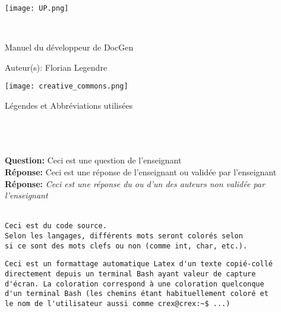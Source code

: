 \documentclass[a4paper, french]{report}
\begin{document}
\begin{titlepage}
    \begin{flushleft}
        \texttt{[image: UP.png]}\par
        \centering
        
        \vspace{13\baselineskip}       
        \HRule \\[0.4cm]

        {\Huge 
        Manuel du développeur de DocGen\par}
        \vspace{0.4cm}
        \HRule
        \vfill
      
        Auteur(s): Florian Legendre\medskip \par
        
        \texttt{[image: creative\_commons.png]}\par
    \end{flushleft}
\end{titlepage}

\newpage
\begin{LARGE}
Légendes et Abbréviations utilisées\\\\\\\\
\end{LARGE}
\textbf{Question:} Ceci est une question de l'enseignant\\
\textbf{Réponse:} Ceci est une réponse de l'enseignant ou validée par l'enseignant\\
\textbf{Réponse:} \textit{Ceci est une réponse du ou d'un des auteurs non validée par l'enseignant}\\\\

\begin{lstlisting}[style=C, caption=Exemple de code source]
Ceci est du code source.
Selon les langages, différents mots seront colorés selon 
si ce sont des mots clefs ou non (comme int, char, etc.).
\end{lstlisting}

\begin{mdframed}[style=Bash]
\begin{lstlisting}[style=Bash, caption=Exemple d'une pseudo capture d'écran Bash]
Ceci est un formattage automatique Latex d'un texte copié-collé
directement depuis un terminal Bash ayant valeur de capture
d'écran. La coloration correspond à une coloration quelconque 
d'un terminal Bash (les chemins étant habituellement coloré et 
le nom de l'utilisateur aussi comme crex@crex:~$ ...)
\end{lstlisting}
\end{mdframed}
\end{document}

